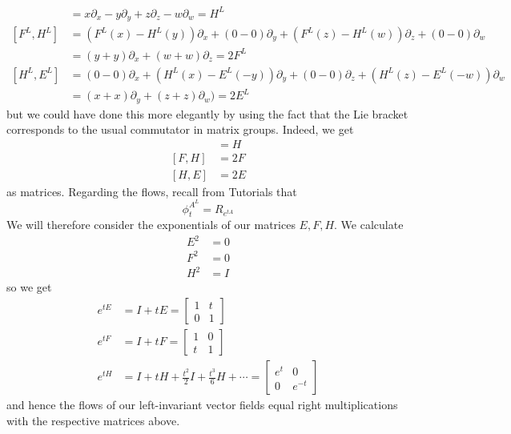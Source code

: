 \documentclass[a4paper, 12pt]{article}
\begin{document}
\begin{Exercise}
\begin{align*}
        &= x \partial_x - y \partial_y + z \partial_z - w \partial_w = H^L \\
        [F^L, H^L]
        &= (F^L(x) - H^L(y)) \partial_x + (0 - 0) \partial_y + (F^L(z) - H^L(w)) \partial_z + (0 - 0) \partial_w \\
        &= (y + y) \partial_x + (w + w) \partial_z = 2F^L \\
        [H^L, E^L]
        &= (0 - 0) \partial_x + (H^L(x) - E^L(-y)) \partial_y + (0 - 0) \partial_z + (H^L(z) - E^L(-w)) \partial_w \\
        &= (x + x) \partial_y + (z + z) \partial_w ) = 2E^L
    \end{align*}
    but we could have done this more elegantly by using the fact that the Lie bracket corresponds to the usual commutator in matrix groups.
    Indeed, we get
    \begin{align*}
        [E, F] &= H \\
        [F, H] &= 2F \\
        [H, E] &= 2E
    \end{align*}
    as matrices.
    Regarding the flows, recall from Tutorials that
    \[
        \phi_t^{A^L} = R_{e^{tA}}
    \]
    We will therefore consider the exponentials of our matrices $E, F, H$.
    We calculate
    \begin{align*}
        E^2 &= 0 \\
        F^2 &= 0 \\
        H^2 &= I
    \end{align*}
    so we get
    \begin{align*}
        e^{tE}
        &= I + tE=
        \begin{bmatrix}
            1 & t \\
            0 & 1
        \end{bmatrix} \\
        e^{tF}
        &= I + tF =
        \begin{bmatrix}
            1 & 0 \\
            t & 1
        \end{bmatrix} \\
        e^{tH}
        &= I + tH + \frac{t^2}{2}I + \frac{t^3}{6}H + \cdots =
        \begin{bmatrix}
            e^t & 0 \\
            0 & e^{-t}
        \end{bmatrix}
    \end{align*}
    and hence the flows of our left-invariant vector fields equal right multiplications with the respective matrices above.
\end{Exercise}
\end{document}
